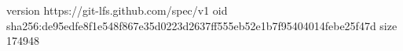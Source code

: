 version https://git-lfs.github.com/spec/v1
oid sha256:de95edfe8f1e548f867e35d0223d2637ff555eb52e1b7f95404014febe25f47d
size 174948
